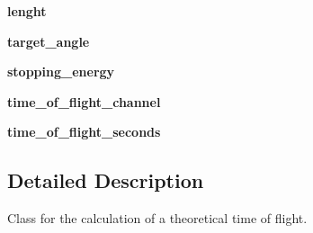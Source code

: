 \begin{DoxyCompactItemize}
\item 
\hypertarget{classModules_1_1Calibration_1_1TOFCalibrationPoint_a9e38b86081ea5dc390f81ab6e661c758}{{\bfseries lenght}}\label{classModules_1_1Calibration_1_1TOFCalibrationPoint_a9e38b86081ea5dc390f81ab6e661c758}

\item 
\hypertarget{classModules_1_1Calibration_1_1TOFCalibrationPoint_a5434cb6b1b6ce752d67721467d3b3197}{{\bfseries target\-\_\-angle}}\label{classModules_1_1Calibration_1_1TOFCalibrationPoint_a5434cb6b1b6ce752d67721467d3b3197}

\item 
\hypertarget{classModules_1_1Calibration_1_1TOFCalibrationPoint_a4c8fc46abc9523bbcca89bdde6ef65d1}{{\bfseries stopping\-\_\-energy}}\label{classModules_1_1Calibration_1_1TOFCalibrationPoint_a4c8fc46abc9523bbcca89bdde6ef65d1}

\item 
\hypertarget{classModules_1_1Calibration_1_1TOFCalibrationPoint_abcfc3e41315fac1b471f912dc03500f5}{{\bfseries time\-\_\-of\-\_\-flight\-\_\-channel}}\label{classModules_1_1Calibration_1_1TOFCalibrationPoint_abcfc3e41315fac1b471f912dc03500f5}

\item 
\hypertarget{classModules_1_1Calibration_1_1TOFCalibrationPoint_a3dbcd2808a33f728f2bdff1188bd1fd1}{{\bfseries time\-\_\-of\-\_\-flight\-\_\-seconds}}\label{classModules_1_1Calibration_1_1TOFCalibrationPoint_a3dbcd2808a33f728f2bdff1188bd1fd1}

\end{DoxyCompactItemize}


\subsection{Detailed Description}
\begin{DoxyVerb}Class for the calculation of a theoretical time of flight.
\end{DoxyVerb}
 

